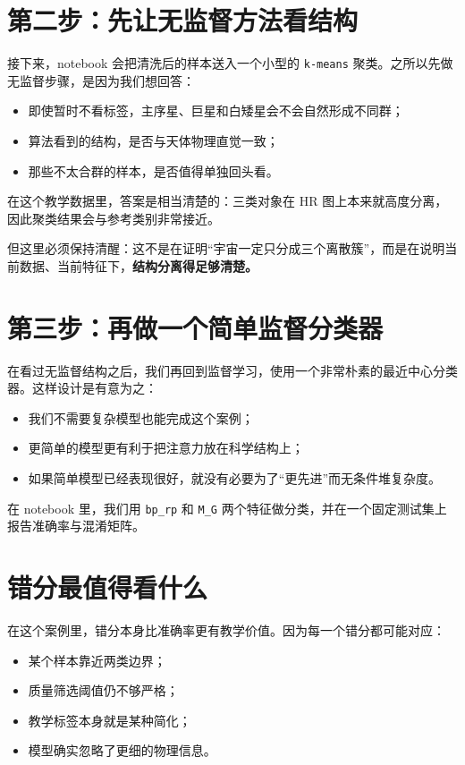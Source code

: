 \section{第二步：先让无监督方法看结构}

接下来，notebook 会把清洗后的样本送入一个小型的 \texttt{k-means} 聚类。之所以先做无监督步骤，是因为我们想回答：

\begin{itemize}
    \item 即使暂时不看标签，主序星、巨星和白矮星会不会自然形成不同群；
    \item 算法看到的结构，是否与天体物理直觉一致；
    \item 那些不太合群的样本，是否值得单独回头看。
\end{itemize}

在这个教学数据里，答案是相当清楚的：三类对象在 HR 图上本来就高度分离，因此聚类结果会与参考类别非常接近。

但这里必须保持清醒：这不是在证明“宇宙一定只分成三个离散簇”，而是在说明当前数据、当前特征下，\textbf{结构分离得足够清楚。}

\section{第三步：再做一个简单监督分类器}

在看过无监督结构之后，我们再回到监督学习，使用一个非常朴素的最近中心分类器。这样设计是有意为之：

\begin{itemize}
    \item 我们不需要复杂模型也能完成这个案例；
    \item 更简单的模型更有利于把注意力放在科学结构上；
    \item 如果简单模型已经表现很好，就没有必要为了“更先进”而无条件堆复杂度。
\end{itemize}

在 notebook 里，我们用 \texttt{bp\_rp} 和 \texttt{M\_G} 两个特征做分类，并在一个固定测试集上报告准确率与混淆矩阵。

\section{错分最值得看什么}

在这个案例里，错分本身比准确率更有教学价值。因为每一个错分都可能对应：

\begin{itemize}
    \item 某个样本靠近两类边界；
    \item 质量筛选阈值仍不够严格；
    \item 教学标签本身就是某种简化；
    \item 模型确实忽略了更细的物理信息。
\end{itemize}

